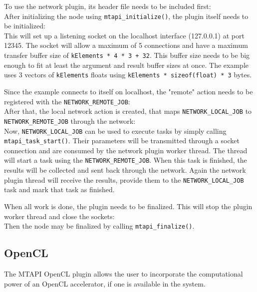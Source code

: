 To use the network plugin, its header file needs to be included first:
%
\\
%
After initializing the node using \lstinline|mtapi_initialize()|, the plugin itself needs to be initialized:
%
\\
%
This will set up a listening socket on the localhost interface (127.0.0.1) at port 12345. The socket will allow a maximum of 5 connections and have a maximum transfer buffer size of \lstinline|kElements * 4 * 3 + 32|. This buffer size needs to be big enough to fit at least the argument and result buffer sizes at once. The example uses 3 vectors of \lstinline|kElements| floats using \lstinline|kElements * sizeof(float) * 3| bytes.

Since the example connects to itself on localhost, the "remote" action needs to be registered with the \lstinline|NETWORK_REMOTE_JOB|:
%
\\
%
After that, the local network action is created, that maps \lstinline|NETWORK_LOCAL_JOB| to \lstinline|NETWORK_REMOTE_JOB| through the network:
%
\\
%
Now, \lstinline|NETWORK_LOCAL_JOB| can be used to execute tasks by simply calling \lstinline|mtapi_task_start()|. Their parameters will be transmitted through a socket connection and are consumed by the network plugin worker thread. The thread will start a task using the \lstinline|NETWORK_REMOTE_JOB|. When this task is finished, the results will be collected and sent back through the network. Again the network plugin thread will receive the results, provide them to the \lstinline|NETWORK_LOCAL_JOB| task and mark that task as finished.

When all work is done, the plugin needs to be finalized. This will stop the plugin worker thread and close the sockets:
%
\\
%
Then the node may be finalized by calling \lstinline|mtapi_finalize()|.

\subsection{OpenCL}

The MTAPI OpenCL plugin allows the user to incorporate the computational power of an OpenCL accelerator, if one is available in the system.

